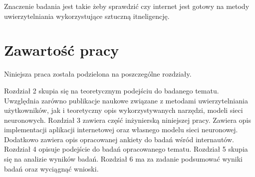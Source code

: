 Znaczenie badania jest takie żeby sprawdzić czy internet jest gotowy na metody uwierzytelniania wykorzystujące sztuczną itneligencję.

\section{Zawartość pracy}
Niniejsza praca została podzielona na poszczególne rozdziały.

Rozdział 2 skupia się na teoretycznym podejściu do badanego tematu. Uwzględnia zarówno publikacje naukowe związane z metodami uwierzytelniania użytkowników, jak i teoretyczny opis wykorzystywanych narzędzi, modeli sieci neuronowych.
Rozdział 3 zawiera część inżynierską niniejszej pracy. Zawiera opis implementacji aplikacji internetowej oraz własnego modelu sieci neuronowej. Dodatkowo zawiera opis opracowanej ankiety do badań wśród internautów.
Rozdział 4 opisuje podejście do badań opracowanego tematu.
Rozdział 5 skupia się na analizie wyników badań.
Rozdział 6 ma za zadanie podsumować wyniki badań oraz wyciągnąć wnioski.





